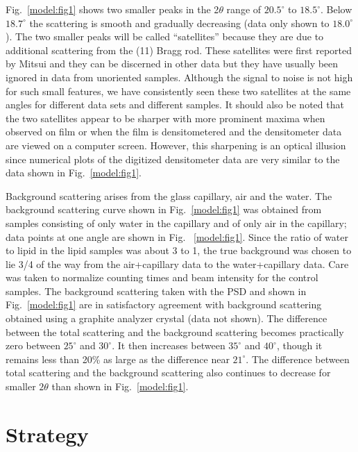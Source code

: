 Fig.\ \ref{model:fig1} shows two smaller peaks in the 2$\theta$ range of $20.5^{\circ}$ to 
$18.5^{\circ}$.
Below $18.7^{\circ}$ the scattering is smooth and gradually decreasing (data only
shown to $18.0^{\circ}$).
The two smaller peaks will be called ``satellites'' because they are due to
additional scattering from the (11) Bragg rod.
These satellites were first reported by Mitsui \cite{Mit78} and they can be discerned
in other data \cite{Sta82} but they have usually been ignored in data
from unoriented samples.
Although the signal to noise is not high for such small features,
we have consistently seen these two satellites at the same angles for
different data sets and different samples.  It should also be noted that the
two satellites appear to be sharper with more prominent maxima when observed on
film or when the film is densitometered and the densitometer
data are viewed on a computer screen.  However, this sharpening is an optical
illusion since numerical plots of the digitized densitometer data are very similar
to the data shown in Fig.\ \ref{model:fig1}.  

Background scattering arises from the glass capillary, air and the water.
The background scattering curve shown in Fig.\ \ref{model:fig1} was obtained
from samples consisting of only water in the capillary and of only
air in the capillary; data points at one angle are shown in 
Fig. \ \ref{model:fig1}.
Since the ratio of water to lipid in the lipid samples
was about 3 to 1, the true background was chosen to lie 3/4 of the way from
the air+capillary data to the water+capillary data.
Care was taken to normalize counting times and beam intensity for the control
samples.
The background scattering taken with the PSD and shown in Fig.\ \ref{model:fig1} are in
satisfactory agreement with background scattering obtained using a graphite
analyzer crystal (data not shown).
The difference between the total scattering and the background scattering
becomes practically zero between $25^{\circ}$ and $30^{\circ}$. It then
increases between $35^{\circ}$ and $40^{\circ}$, though 
it remains less than 20\% as large as the difference
near $21^{\circ}$.  The difference between total scattering and
the background scattering also continues to 
decrease for smaller $2 \theta$ than shown in Fig.\ \ref{model:fig1}.

\section{Strategy}
\label{gel_model_strategy}

